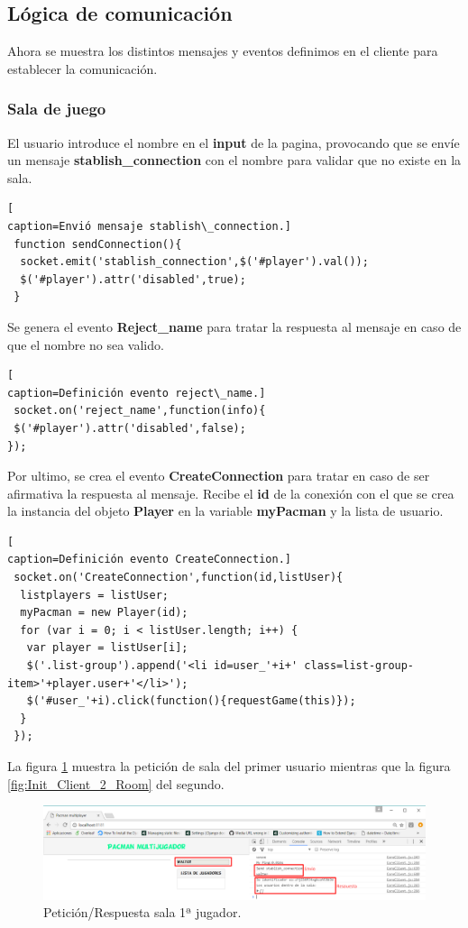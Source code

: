 \subsection{Lógica de comunicación}
Ahora se muestra los distintos mensajes y eventos definimos en el cliente para establecer la comunicación.
\subsubsection*{Sala de juego}
El usuario introduce el nombre en el \textbf{input} de la pagina, provocando que se envíe un mensaje \textbf{stablish\_connection} con el nombre para validar que no existe en la sala.
\begin{lstlisting}[
caption=Envió mensaje stablish\_connection.]
 function sendConnection(){
  socket.emit('stablish_connection',$('#player').val());
  $('#player').attr('disabled',true);
 }
\end{lstlisting}
Se genera el evento \textbf{Reject\_name} para tratar la respuesta al mensaje en caso de que el nombre no sea valido.
\begin{lstlisting}[
caption=Definición evento reject\_name.]
 socket.on('reject_name',function(info){
 $('#player').attr('disabled',false);
});
\end{lstlisting}
Por ultimo, se crea el evento \textbf{CreateConnection} para tratar en caso de ser afirmativa la respuesta al mensaje. Recibe el \textbf{id} de la conexión con el que se crea la instancia del objeto \textbf{Player} en la variable \textbf{myPacman} y la lista de usuario. 
\begin{lstlisting}[
caption=Definición evento CreateConnection.]
 socket.on('CreateConnection',function(id,listUser){
  listplayers = listUser;
  myPacman = new Player(id);
  for (var i = 0; i < listUser.length; i++) {
   var player = listUser[i];
   $('.list-group').append('<li id=user_'+i+' class=list-group-item>'+player.user+'</li>');
   $('#user_'+i).click(function(){requestGame(this)});
  }	
 });
\end{lstlisting}
La figura \ref{fig:Init_Client1_Room} muestra la petición de sala del primer usuario mientras que la figura \ref{fig:Init_Client_2_Room} del segundo.
\begin{figure}[!h]
\begin{center}
  \includegraphics[width=0.6\linewidth]{Figures/Init_Client1_Room}
	\decoRule
	\caption[Petición/Respuesta sala 1ª jugador.]{Petición/Respuesta sala 1ª jugador.}
\label{fig:Init_Client1_Room}
\end{center}
\end{figure}

